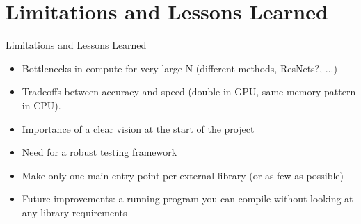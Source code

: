 \documentclass{beamer}
\begin{document}


\section{Limitations and Lessons Learned}
\begin{frame}{Limitations and Lessons Learned}
    \begin{itemize}
        \item Bottlenecks in compute for very large N (different methods, ResNets?, ...)
        \item Tradeoffs between accuracy and speed (double in GPU, same memory pattern in CPU).
        \item Importance of a clear vision at the start of the project
        \item Need for a robust testing framework
        \item Make only one main entry point per external library (or as few as possible)
        \item Future improvements: a running program you can compile without looking at any library requirements
    \end{itemize}
\end{frame}
\end{document}
